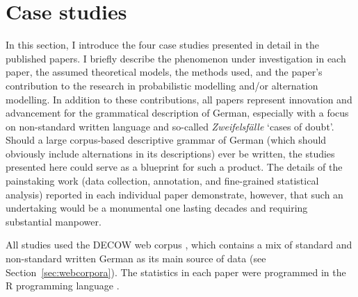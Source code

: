 \section{Case studies}
\label{sec:casestudies}

In this section, I introduce the four case studies presented in detail in the published papers.
I briefly describe the phenomenon under investigation in each paper, the assumed theoretical models, the methods used, and the paper's contribution to the research in probabilistic modelling and\slash or alternation modelling.
In addition to these contributions, all papers represent innovation and advancement for the grammatical description of German, especially with a focus on non-standard written language and so-called \textit{Zweifelsfälle} `cases of doubt'.
Should a large corpus-based descriptive grammar of German (which should obviously include alternations in its descriptions) ever be written, the studies presented here could serve as a blueprint for such a product.
The details of the painstaking work (data collection, annotation, and fine-grained statistical analysis) reported in each individual paper demonstrate, however, that such an undertaking would be a monumental one lasting decades and requiring substantial manpower.

All studies used the DECOW web corpus \citep{SchaeferBildhauer2012,Schaefer2015b}, which contains a mix of standard and non-standard written German as its main source of data (see Section~\ref{sec:webcorpora}).
The statistics in each paper were programmed in the R programming language \citep{R}.

